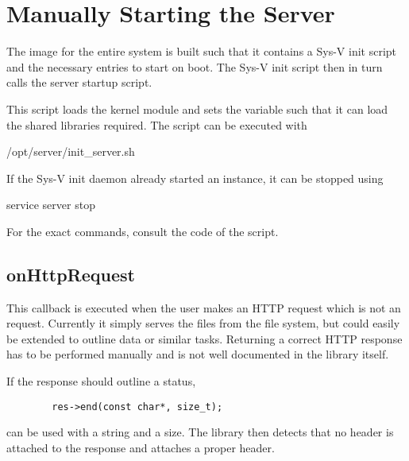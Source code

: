 \section{Manually Starting the Server} %
\label{sec:devguide:server:build}

The image for  the entire system is  built such that it contains  a Sys-V init
script and the necessary entries to start on boot.  The Sys-V init script then
in turn calls the server startup script.

This  script loads  the kernel  module and  sets the  
variable such that  it can load the shared libraries  required. The script can
be executed with
\begin{commandshell}
    /opt/server/init_server.sh
\end{commandshell}
If the Sys-V init daemon already started an instance, it can be stopped using
\begin{commandshell}
    service server stop
\end{commandshell}
For the exact commands, consult the code of the  script.

\subsection{onHttpRequest} %
\label{subsec:devguide:server:onhttprequest}

This callback is executed when the user  makes an HTTP request which is not an
 request. Currently  it simply  serves the  files from  the file
system,  but could  easily  be  extended to  outline  data  or similar  tasks.
Returning a correct HTTP response has to be performed manually and is not well
documented in the library itself.

If the response should outline a  status,
\begin{tcolorbox}[skin=alpenlisting]
    \begin{verbatim}
        res->end(const char*, size_t);
    \end{verbatim}
\end{tcolorbox}
\noindent can be used with a string  and a size. The library then detects that
no header  is attached  to the  response and attaches  a proper  
header.

